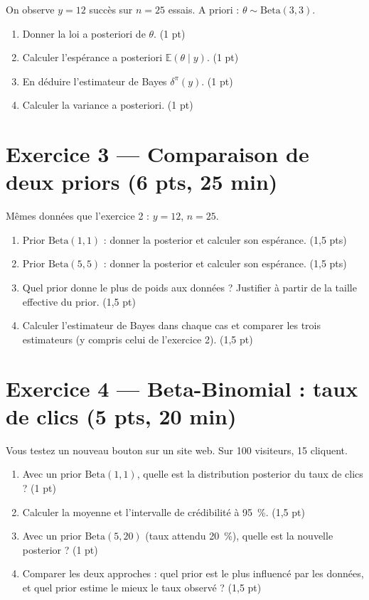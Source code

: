 \documentclass[11pt,a4paper]{article}
\begin{document}
On observe $y = 12$ succès sur $n = 25$ essais. A priori : $\theta \sim \mathrm{Beta}(3, 3)$.

\begin{enumerate}[label=\alph*)]
  \item Donner la loi a posteriori de $\theta$. \hfill (1 pt)
  \item Calculer l'espérance a posteriori $\mathbb{E}(\theta \mid y)$. \hfill (1 pt)
  \item En déduire l'estimateur de Bayes $\delta^\pi(y)$. \hfill (1 pt)
  \item Calculer la variance a posteriori. \hfill (1 pt)
\end{enumerate}

\section*{Exercice 3 --- Comparaison de deux priors (6 pts, 25 min)}

Mêmes données que l'exercice 2 : $y = 12$, $n = 25$.

\begin{enumerate}[label=\alph*)]
  \item Prior $\mathrm{Beta}(1, 1)$ : donner la posterior et calculer son espérance. \hfill (1,5 pts)
  \item Prior $\mathrm{Beta}(5, 5)$ : donner la posterior et calculer son espérance. \hfill (1,5 pts)
  \item Quel prior donne le plus de poids aux données ? Justifier à partir de la taille effective du prior. \hfill (1,5 pt)
  \item Calculer l'estimateur de Bayes dans chaque cas et comparer les trois estimateurs (y compris celui de l'exercice 2). \hfill (1,5 pt)
\end{enumerate}

\section*{Exercice 4 --- Beta-Binomial : taux de clics (5 pts, 20 min)}

Vous testez un nouveau bouton sur un site web. Sur 100 visiteurs, 15 cliquent.

\begin{enumerate}[label=\alph*)]
  \item Avec un prior $\mathrm{Beta}(1, 1)$, quelle est la distribution posterior du taux de clics ? \hfill (1 pt)
  \item Calculer la moyenne et l'intervalle de crédibilité à 95~\%. \hfill (1,5 pt)
  \item Avec un prior $\mathrm{Beta}(5, 20)$ (taux attendu 20~\%), quelle est la nouvelle posterior ? \hfill (1 pt)
  \item Comparer les deux approches : quel prior est le plus influencé par les données, et quel prior estime le mieux le taux observé ? \hfill (1,5 pt)
\end{enumerate}
\end{document}
